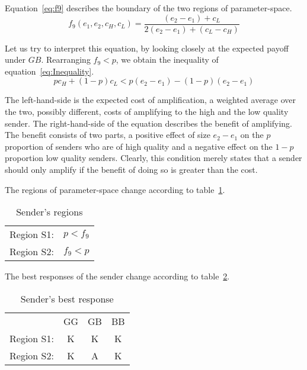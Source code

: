 \documentclass[a4paper,12pt]{article}
\numberwithin{equation}{section}
\begin{document}
\vspace{6mm}

Equation~\ref{eq:f9} describes the boundary of the two regions of parameter-space.
\begin{equation}
\label{eq:f9}
f_{9}(e_{1},e_{2},c_{H},c_{L})=\frac{(e_{2}-e_{1})+c_{L}}{2(e_{2}-e_{1})+(c_{L}-c_{H})}
\end{equation}

Let us try to interpret this equation, by looking closely at the expected payoff under $GB$. Rearranging $f_{9}<p$, we obtain the inequality of equation~\ref{eq:Inequality}.
\begin{equation}
\label{eq:Inequality}
p c_{H}+(1-p)c_{L}<p(e_{2}-e_{1})-(1-p)(e_{2}-e_{1})
\end{equation}

The left-hand-side is the expected cost of amplification, a weighted average over the two, possibly different, costs of amplifying to the high and the low quality sender. The right-hand-side of the equation describes the benefit of amplifying. The benefit consists of two parts, a positive effect of size $e_{2}-e_{1}$ on the $p$ proportion of senders who are of high quality and a negative effect on the $1-p$ proportion low quality senders. Clearly, this condition merely states that a sender should only amplify if the benefit of doing so is greater than the cost.

The regions of parameter-space change according to table~\ref{tab:Appendix/Cue Game with Unconditional Amplification/RegionS}.

\begin{table}[h]
\begin{center}
\begin{tabular}{lc}
Region S1: & $p<f_{9}$\\
Region S2: & $f_{9}<p$
\end{tabular}
\end{center}
\caption{Sender's regions}
\label{tab:Appendix/Cue Game with Unconditional Amplification/RegionS}
\end{table}

\newpage

The best responses of the sender change according to table~\ref{tab:Appendix/Cue Game with Unconditional Amplification/BestResponseS}.

\begin{table}[h]
\begin{center}
\begin{tabular}{lccc}
 & GG & GB & BB\\
Region S1: & K & K & K\\
Region S2: & K & A & K
\end{tabular}
\end{center}
\caption{Sender's best response}
\label{tab:Appendix/Cue Game with Unconditional Amplification/BestResponseS}
\end{table}
\end{document}
